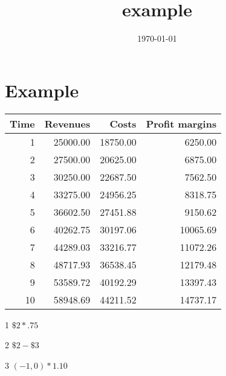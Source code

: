 \documentclass[11pt]{article}
\date{\today}
\title{example}
\begin{document}
\maketitle
\tableofcontents

\section{Example}
\label{sec-1}


\begin{table}
\centering
\begin{threeparttable}

\begin{tabular}{rrrr}
Time & Revenues & Costs\tnote{1} & Profit margins\tnote{2}\\
\hline
1 & 25000.00 & 18750.00 & 6250.00\\
2 & 27500.00 & 20625.00 & 6875.00\\
3 & 30250.00 & 22687.50 & 7562.50\\
4 & 33275.00 & 24956.25 & 8318.75\\
5 & 36602.50 & 27451.88 & 9150.62\\
6 & 40262.75 & 30197.06 & 10065.69\\
7 & 44289.03 & 33216.77 & 11072.26\\
8 & 48717.93 & 36538.45 & 12179.48\\
9 & 53589.72 & 40192.29 & 13397.43\\
10 & 58948.69 & 44211.52 & 14737.17\\
\hline
\end{tabular}

\begin{tablenotes}
\item [1] \(\$2*.75\)
\item [2] \(\$2-\$3\)
\item [3] \((-1,0)*1.10\)
\end{tablenotes}

\end{threeparttable}
\end{table}
\end{document}
